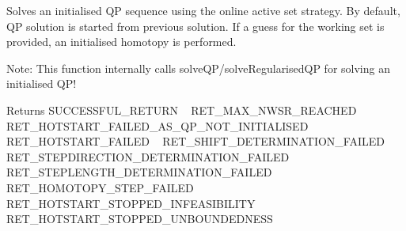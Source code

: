 Solves an initialised QP sequence using the online active set strategy. By default, QP solution is started from previous solution. If a guess for the working set is provided, an initialised homotopy is performed.

Note\+: This function internally calls solve\+Q\+P/solve\+Regularised\+QP for solving an initialised Q\+P!

\begin{DoxyReturn}{Returns}
S\+U\+C\+C\+E\+S\+S\+F\+U\+L\+\_\+\+R\+E\+T\+U\+RN ~\newline
 R\+E\+T\+\_\+\+M\+A\+X\+\_\+\+N\+W\+S\+R\+\_\+\+R\+E\+A\+C\+H\+ED ~\newline
 R\+E\+T\+\_\+\+H\+O\+T\+S\+T\+A\+R\+T\+\_\+\+F\+A\+I\+L\+E\+D\+\_\+\+A\+S\+\_\+\+Q\+P\+\_\+\+N\+O\+T\+\_\+\+I\+N\+I\+T\+I\+A\+L\+I\+S\+ED ~\newline
 R\+E\+T\+\_\+\+H\+O\+T\+S\+T\+A\+R\+T\+\_\+\+F\+A\+I\+L\+ED ~\newline
 R\+E\+T\+\_\+\+S\+H\+I\+F\+T\+\_\+\+D\+E\+T\+E\+R\+M\+I\+N\+A\+T\+I\+O\+N\+\_\+\+F\+A\+I\+L\+ED ~\newline
 R\+E\+T\+\_\+\+S\+T\+E\+P\+D\+I\+R\+E\+C\+T\+I\+O\+N\+\_\+\+D\+E\+T\+E\+R\+M\+I\+N\+A\+T\+I\+O\+N\+\_\+\+F\+A\+I\+L\+ED ~\newline
 R\+E\+T\+\_\+\+S\+T\+E\+P\+L\+E\+N\+G\+T\+H\+\_\+\+D\+E\+T\+E\+R\+M\+I\+N\+A\+T\+I\+O\+N\+\_\+\+F\+A\+I\+L\+ED ~\newline
 R\+E\+T\+\_\+\+H\+O\+M\+O\+T\+O\+P\+Y\+\_\+\+S\+T\+E\+P\+\_\+\+F\+A\+I\+L\+ED ~\newline
 R\+E\+T\+\_\+\+H\+O\+T\+S\+T\+A\+R\+T\+\_\+\+S\+T\+O\+P\+P\+E\+D\+\_\+\+I\+N\+F\+E\+A\+S\+I\+B\+I\+L\+I\+TY ~\newline
 R\+E\+T\+\_\+\+H\+O\+T\+S\+T\+A\+R\+T\+\_\+\+S\+T\+O\+P\+P\+E\+D\+\_\+\+U\+N\+B\+O\+U\+N\+D\+E\+D\+N\+E\+SS 
\end{DoxyReturn}

